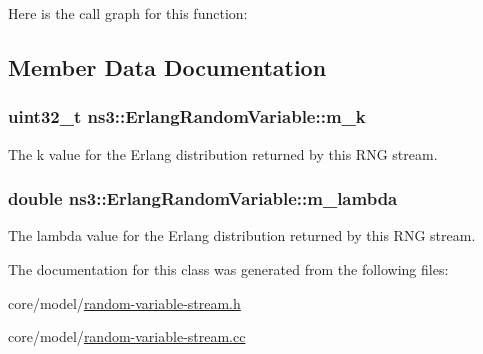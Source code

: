 Here is the call graph for this function\+:




\subsection{Member Data Documentation}
\subsubsection[{\texorpdfstring{m\+\_\+k}{m_k}}]{\setlength{\rightskip}{0pt plus 5cm}uint32\+\_\+t ns3\+::\+Erlang\+Random\+Variable\+::m\+\_\+k\hspace{0.3cm}{\ttfamily [private]}}\hypertarget{classns3_1_1ErlangRandomVariable_aba3e31567d448969e496c45edc80aabe}{}\label{classns3_1_1ErlangRandomVariable_aba3e31567d448969e496c45edc80aabe}
The k value for the Erlang distribution returned by this R\+NG stream. 
\subsubsection[{\texorpdfstring{m\+\_\+lambda}{m_lambda}}]{\setlength{\rightskip}{0pt plus 5cm}double ns3\+::\+Erlang\+Random\+Variable\+::m\+\_\+lambda\hspace{0.3cm}{\ttfamily [private]}}\hypertarget{classns3_1_1ErlangRandomVariable_a035cbd956276b953c22eff30c979d651}{}\label{classns3_1_1ErlangRandomVariable_a035cbd956276b953c22eff30c979d651}
The lambda value for the Erlang distribution returned by this R\+NG stream. 

The documentation for this class was generated from the following files\+:\begin{DoxyCompactItemize}
\item 
core/model/\hyperlink{random-variable-stream_8h}{random-\/variable-\/stream.\+h}\item 
core/model/\hyperlink{random-variable-stream_8cc}{random-\/variable-\/stream.\+cc}\end{DoxyCompactItemize}
